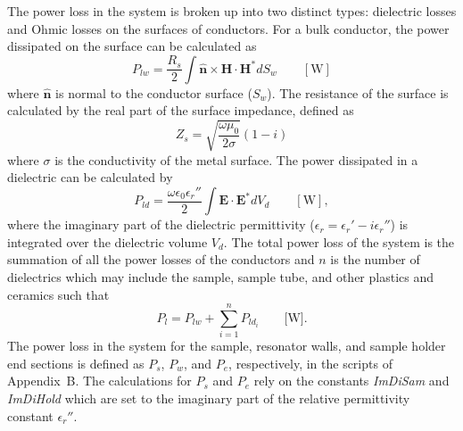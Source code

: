The power loss in the system is broken up into two distinct types: dielectric losses and Ohmic losses on the surfaces of conductors. For a bulk conductor, the power dissipated on the surface can be calculated as
\begin{equation}
    P_{lw} = \frac{R_s}{2}\int \mathbf{\hat{n}}\times\mathbf{H}\cdot\mathbf{H}^* dS_w \qquad [\text{W}]
\end{equation}
where $\mathbf{\hat{n}}$ is normal to the conductor surface ($S_w$). The resistance of the surface is calculated by the real part of the surface impedance, defined as
\begin{equation}
    Z_s = \sqrt{\frac{\omega \mu_0}{2 \sigma}}(1-i)
\end{equation}
where $\sigma$ is the conductivity of the metal surface. The power dissipated in a dielectric can be calculated by
\begin{equation}
    P_{ld} = \frac{\omega \epsilon_0 \epsilon_r''}{2}\int \mathbf{E} \cdot \mathbf{E}^* dV_d \qquad [\text{W}],
\end{equation}
where the imaginary part of the dielectric permittivity ($\epsilon_r = \epsilon_r' - i \epsilon_r''$) is integrated over the dielectric volume $V_d$. \cite{jackson1975classical,harrington1961time} The total power loss of the system is the summation of all the power losses of the conductors and $n$ is the number of dielectrics which may include the sample, sample tube, and other plastics and ceramics such that
\begin{equation}
    P_l = P_{lw} + \sum_{i=1}^n P_{ld_i} \qquad \text{[W].}
\end{equation}
The power loss in the system for the sample, resonator walls, and sample holder end sections is defined as $P_s$, $P_w$, and $P_e$, respectively, in the scripts of Appendix~B. The calculations for $P_s$ and $P_e$ rely on the constants \textit{ImDiSam} and \textit{ImDiHold} which are set to the imaginary part of the relative permittivity constant $\epsilon_r''$.

